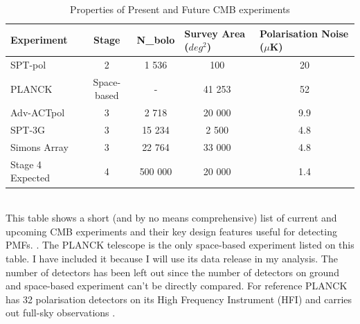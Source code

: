 \begin{table}[b]
\centering
\caption{Properties of Present and Future CMB experiments}
\label{my-label}
\begin{tabular}{l|l|l|l|l}
Experiment & \multicolumn{1}{c|}{Stage} & \multicolumn{1}{c|}{N_{bolo}} & Survey Area ($deg^{2}$)& Polarisation Noise ($\mu$K) \\ \hline
SPT-pol & \multicolumn{1}{c|}{2} & \multicolumn{1}{c|}{1 536} & \multicolumn{1}{c|}{100} & \multicolumn{1}{c}{20} \\
PLANCK & \multicolumn{1}{c|}{Space-based} & \multicolumn{1}{c|}{-} & \multicolumn{1}{c|}{41 253} & \multicolumn{1}{c}{52} \\
Adv-ACTpol & \multicolumn{1}{c|}{3} & \multicolumn{1}{c|}{2 718} & \multicolumn{1}{c|}{20 000} & \multicolumn{1}{c}{9.9} \\
SPT-3G & \multicolumn{1}{c|}{3} & \multicolumn{1}{c|}{15 234} & \multicolumn{1}{c|}{2 500} & \multicolumn{1}{c}{4.8} \\
Simons Array & \multicolumn{1}{c|}{3} & \multicolumn{1}{c|}{22 764} & \multicolumn{1}{c|}{33 000} & \multicolumn{1}{c}{4.8} \\ 
Stage 4 Expected & \multicolumn{1}{c|}{4} & \multicolumn{1}{c|}{500 000} & \multicolumn{1}{c|}{20 000} & \multicolumn{1}{c}{1.4} \\
\end{tabular}
\bigskip
\\This table shows a short (and by no means comprehensive) list of current and upcoming CMB experiments and their key design features useful for detecting PMFs. \citep{Henderson:2015nzj} \citep{Benson:2014qhw}  \citep{Adam:2015vua}. The PLANCK telescope is the only space-based experiment listed on this table. I have included it because I will use its data release in my analysis. The number of detectors has been left out since the number of detectors on ground and space-based experiment can't be directly compared. For reference PLANCK has 32 polarisation detectors on its High Frequency Instrument (HFI) and carries out full-sky observations \citep{Lamarre:2003zh}.
\end{table}
